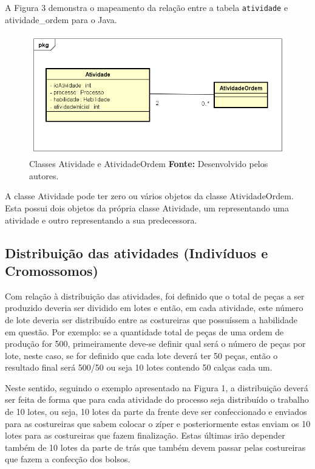 \par A Figura 3 demonstra o mapeamento da relação entre a tabela
\texttt{atividade} e atividade\_ordem para o Java.

\begin{figure}[h!]
	\centerline{\includegraphics[scale=0.7]{./imagens/atividade_diagram.png}}
	\caption[Classe atividade]
	{Classes Atividade e AtividadeOrdem \textbf{Fonte:} Desenvolvido pelos
	autores.}
	\label{fig:exemplo1}
\end{figure} 

\par A classe Atividade pode ter zero ou vários objetos da classe
AtividadeOrdem.
Esta possui dois objetos da própria classe Atividade, um representando uma
atividade e outro representando a sua predecessora.

\subsection{Distribuição das atividades (Indivíduos e Cromossomos)}

\par Com relação à distribuição das atividades, foi definido que o total de
peças a ser produzido deveria ser dividido em lotes e então, em cada atividade,
este número de lote deveria ser distribuído entre as costureiras que possuíssem a habilidade em questão. Por exemplo: se a quantidade total de peças de uma ordem de produção for 500,
primeiramente deve-se definir qual será o número de peças por lote, neste caso, se for definido que cada lote  
deverá ter 50 peças, então o resultado final será 500/50 ou seja 10 lotes contendo 50 calças cada um. 

\par Neste sentido, seguindo o exemplo apresentado  na Figura 1, a distribuição
deverá ser feita de forma que para cada atividade do processo seja distribuído o trabalho de 10 lotes, ou seja, 10 lotes da parte da frente deve ser confeccionado e enviados para as costureiras que sabem colocar
o zíper e posteriormente estas enviam os 10 lotes para as costureiras que fazem finalização. Estas últimas irão depender
também de 10 lotes da parte de trás que também devem passar pelas costureiras que fazem a confecção dos bolsos. 


